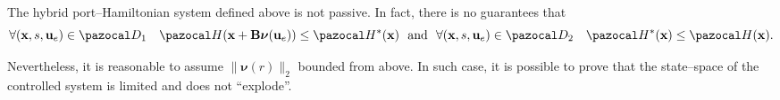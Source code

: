 The hybrid port--Hamiltonian system defined above is not passive. In fact, there is no guarantees that
%
\begin{equation}
	\forall (\xb,s,\ub_e)\in\D_1 \quad \Ha(\xb+\Bb\bm\nu(\ub_e))\leq\Ha^*(\xb)~~\text{and}~~ 	\forall(\xb,s,\ub_e)\in\D_2 \quad \Ha^*(\xb)\leq\Ha(\xb).
\end{equation}
% 

Nevertheless, it is reasonable to assume $\|\bm\nu(r)\|_2$ bounded from above. In such case, it is possible to prove that the state--space of the controlled system is limited and does not ``explode''. 


%
%		
\clearpage
